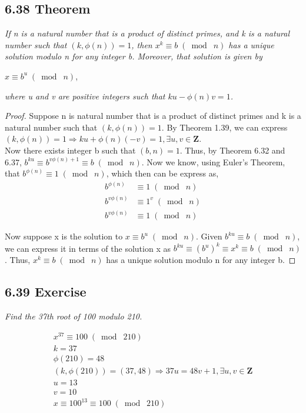 \documentclass{article}
\begin{document}
\subsection*{6.38 Theorem} 
\quad \textit{If n is a natural number that is a product of distinct primes, and k is a natural number such that $(k, \phi(n)) = 1$, then $x^k \equiv b \;(\bmod\; n)$ has a unique solution modulo n for any integer b. Moreover, that solution is given by}
\begin{center}
    $x \equiv b^u \;(\bmod\; n)$,
\end{center}
\textit{where u and v are positive integers such that $ku - \phi(n)v = 1$.}

\begin{proof}
Suppose n is natural number that is a product of distinct primes and k is a natural number such that $(k, \phi(n)) = 1$. By Theorem 1.39, we can express $(k, \phi(n)) = 1 \Longrightarrow ku + \phi(n)(-v) = 1, \exists u, v \in \mathbf{Z}$.\\
Now there exists integer b such that $(b, n) = 1$. Thus, by Theorem 6.32 and 6.37, $b^{ku} \equiv b^{v\phi{(n)}+1} \equiv  b \;(\bmod\; n)$. Now we know, using Euler's Theorem, that $b^{\phi(n)} \equiv  1 \;(\bmod\; n)$, which then can be express as,
\begin{align*}
    &&b^{\phi(n)} &\equiv  1 \;(\bmod\; n)&&\\
    &&b^{v\phi(n)} &\equiv  1^v \;(\bmod\; n)&&\\
    &&b^{v\phi(n)} &\equiv  1 \;(\bmod\; n)&&
\end{align*}

Now suppose x is the solution to $x \equiv b^u \;(\bmod\; n)$. Given $b^{ku} \equiv b \;(\bmod\; n)$, we can express it in terms of the solution x as $b^{ku} \equiv (b^u)^k \equiv x^k \equiv b \;(\bmod\; n)$. Thus, $x^k \equiv b \;(\bmod\; n)$ has a unique solution modulo n for any integer b.
\end{proof}

\subsection*{6.39 Exercise}
\quad \textit{Find the 37th root of 100 modulo 210.}

\begin{align*}
    &x^{37} \equiv 100 \;(\bmod\; 210)&\\
    &k = 37&\\
    &\phi(210) = 48&\\
    &(k, \phi(210)) = (37, 48) \Longrightarrow 37u = 48v+1 , \exists u, v \in \mathbf{Z}&\\
    &u = 13&\\
    &v = 10&\\
    &x \equiv 100^{13} \equiv 100 \;(\bmod\; 210)&
\end{align*}
\end{document}
